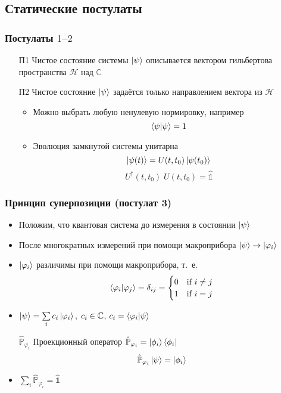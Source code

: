 \subsection{Статические постулаты}
\begin{frame}
    \frametitle{Постулаты $1$--$2$}
    \begin{itemize}[<+->]
    \item[П1] Чистое состояние системы $\ket{\psi}$ описывается
    вектором гильбертова пространства $\mathcal{H}$ над $\mathbb{C}$
    \item[П2] Чистое состояние $\ket{\psi}$ задаётся
    только направлением вектора из $\mathcal{H}$
        \begin{itemize}[<+->]
        \item Можно выбрать любую ненулевую нормировку, например
        $$ \braket{\psi|\psi} = 1 $$
        \item Эволюция замкнутой системы унитарна
        $$ \ket{\psi (t)} = U (t, t_0) \ket{\psi (t_0)}$$
        $$ U^\dagger (t, t_0) \; U (t, t_0) = \hat{\mathbb{1}} $$
        \end{itemize}
    \end{itemize}
\end{frame}
\begin{frame}
    \frametitle{Принцип суперпозиции (постулат 3)}
    \begin{itemize}[<+->]
    \item Положим, что квантовая система до измерения в состоянии
    $\ket{\psi}$
    \item После многократных измерений при помощи макроприбора
    $\ket{\psi} \to \ket{\varphi_i}$
    \item $\ket{\varphi_i}$ различимы при помощи макроприбора, т.~е.
    $$ \braket {\varphi_i| \varphi_j} = \delta_{ij} = 
        \begin{cases}
        0 & \text {if $i \ne j $} \\
        1 & \text {if $i = j $}
        \end{cases}
    $$
    \item
    $ \ket {\psi} = \sum\limits_i c_i \ket {\varphi_i},\;c_i \in \mathbb{C} $,
    $ c_i = \braket{\varphi_i | \psi} $
    \item[$\hat{\mathbb{P}}_{\varphi_i}$] Проекционный оператор
    $\hat{\mathbb{P}}_{\varphi_i} = \ket{\phi_i}\bra{\phi_i}$
    $$\hat{\mathbb{P}}_{\varphi_i}\ket{\psi} = \ket{\phi_i}$$
    \item $\sum\limits_i \hat{\mathbb{P}}_{\varphi_i} = \hat{\mathbb{1}}$
    \end{itemize}
\end{frame}
